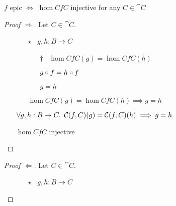 \begin{prop}
  $f$ epic $\iff$ $\hom{C}{f}{C}$ injective for any $C\in\cat{C}$

  \begin{proof}[Proof $\Rightarrow$]
    Let $C\in\cat{C}$.
    \begin{itemize}
      \item[\phs]
        \begin{itemize}
          \item[$\star$] \Let~$g, h : B\to C$
            \marginnote{\Hyp}

          \item[\phs]
            \begin{itemize}
              \item[$\dagger$]
                \Ass~$\hom{C}{f}{C}(g) = \hom{C}{f}{C}(h)$
                \marginnote{\Hyp}

            \item[\iffs] $g\compose f = h\compose f$
              \marginnote{\Def-\ref{def:contra-hom}}

            \item[\imps] $g = h$
            \end{itemize}

          \item[\imps] $\hom{C}{f}{C}(g) = \hom{C}{f}{C}(h) \implies g = h$
            \marginnote{\imps-\Intro-$\dagger$}
        \end{itemize}
      \item[\imps] $\forall g, h : B \to C\ldotp~\hom{C}{f}{C}(g) = \hom{C}{f}{C}(h) \implies g = h$
        \marginnote{$\forall$-\Intro-$\star$}

      \item[\iffs] $\hom{C}{f}{C}$ injective
        \qedhere
    \end{itemize}
  \end{proof}

  \begin{proof}[Proof $\Leftarrow$]
    Let $C\in\cat{C}$.
    \begin{itemize}
      \item[\phs]
        \begin{itemize}
          \item[$\star$]
            \Let~$g, h : B\to C$
            \marginnote{\Hyp}


\end{itemize}
\end{itemize}
\end{proof}
\end{prop}
